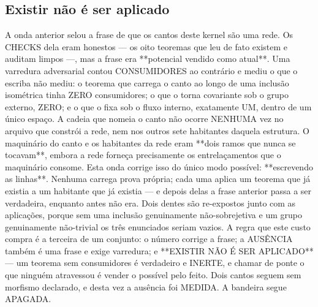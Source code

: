 \documentclass[11pt]{article}
\theoremstyle{definition}\newtheorem{deriv}{Derivação}
\begin{document}
\subsection*{Existir n\~ao \'e ser aplicado}A onda anterior selou a frase de que os cantos deste kernel s\~ao uma rede. Os CHECKS dela eram honestos --- os oito teoremas que leu de fato existem e auditam limpos ---, mas a frase era **potencial vendido como atual**. Uma varredura adversarial contou CONSUMIDORES ao contr\'ario e mediu o que o escriba n\~ao mediu: o teorema que carrega o canto ao longo de uma inclus\~ao isom\'etrica tinha ZERO consumidores; o que o torna covariante sob o grupo externo, ZERO; e o que o fixa sob o fluxo interno, exatamente UM, dentro de um \'unico espa\c{c}o. A cadeia que nomeia o canto n\~ao ocorre NENHUMA vez no arquivo que constr\'oi a rede, nem nos outros sete habitantes daquela estrutura. O maquin\'ario do canto e os habitantes da rede eram **dois ramos que nunca se tocavam**, embora a rede forne\c{c}a precisamente os entrela\c{c}amentos que o maquin\'ario consome. Esta onda corrige isso do \'unico modo poss\'ivel: **escrevendo as linhas**. Nenhuma carrega prova pr\'opria; cada uma aplica um teorema que j\'a existia a um habitante que j\'a existia --- e depois delas a frase anterior passa a ser verdadeira, enquanto antes n\~ao era. Dois dentes s\~ao re-expostos junto com as aplica\c{c}\~oes, porque sem uma inclus\~ao genuinamente n\~ao-sobrejetiva e um grupo genuinamente n\~ao-trivial os tr\^es enunciados seriam vazios. A regra que este custo compra \'e a terceira de um conjunto: o n\'umero corrige a frase; a AUS\^ENCIA tamb\'em \'e uma frase e exige varredura; e **EXISTIR N\~AO \'E SER APLICADO** --- um teorema sem consumidores \'e verdadeiro e INERTE, e chamar de ponte o que ningu\'em atravessou \'e vender o poss\'ivel pelo feito. Dois cantos seguem sem morfismo declarado, e desta vez a aus\^encia foi MEDIDA. A bandeira segue APAGADA.
\end{document}
